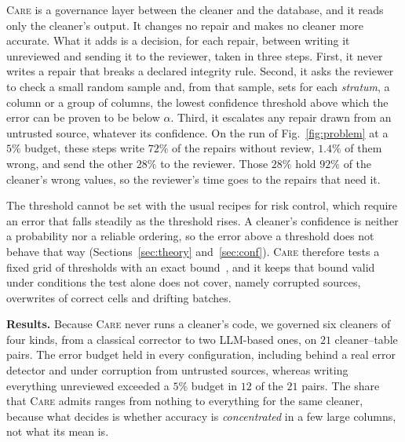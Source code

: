 \documentclass[sigconf, nonacm, balance=false]{acmart}
\theoremstyle{remark}
\begin{document}
\textsc{Care} is a governance layer between the cleaner and the database, and it reads
only the cleaner's output. It changes no repair and makes no cleaner more accurate.
What it adds is a decision, for each repair, between writing it unreviewed and sending
it to the reviewer, taken in three steps. First, it never writes a repair that breaks a
declared integrity rule. Second, it asks the reviewer to check a small random sample
and, from that sample, sets for each \emph{stratum}, a column or a group of columns, the
lowest confidence threshold above which the error can be proven to be below $\alpha$.
Third, it escalates any repair drawn from an untrusted source, whatever its confidence.
On the run of Fig.~\ref{fig:problem} at a $5\%$ budget, these steps write $72\%$ of
the repairs without review, $1.4\%$ of them wrong, and send the other $28\%$ to the
reviewer. Those $28\%$ hold $92\%$ of the cleaner's wrong values, so the reviewer's time
goes to the repairs that need it.

The threshold cannot be set with the usual recipes for risk control, which require an
error that falls steadily as the threshold rises. A cleaner's confidence is neither a
probability nor a reliable ordering, so the error above a threshold does not behave
that way (Sections~\ref{sec:theory} and~\ref{sec:conf}). \textsc{Care} therefore tests
a fixed grid of thresholds with an exact bound~\cite{10.1214/24-AOAS1998}, and it keeps
that bound valid under conditions the test alone does not cover, namely corrupted
sources, overwrites of correct cells and drifting batches.

\textbf{Results.} Because \textsc{Care} never runs a cleaner's code, we governed six
cleaners of four kinds, from a classical corrector to two LLM-based ones, on $21$
cleaner--table pairs. The error budget held in every configuration, including behind a
real error detector and under corruption from untrusted sources, whereas writing
everything unreviewed exceeded a $5\%$ budget in $12$ of the $21$ pairs. The share that
\textsc{Care} admits ranges from nothing to everything for the same cleaner, because
what decides is whether accuracy is \emph{concentrated} in a few large columns, not what
its mean is.
\end{document}
